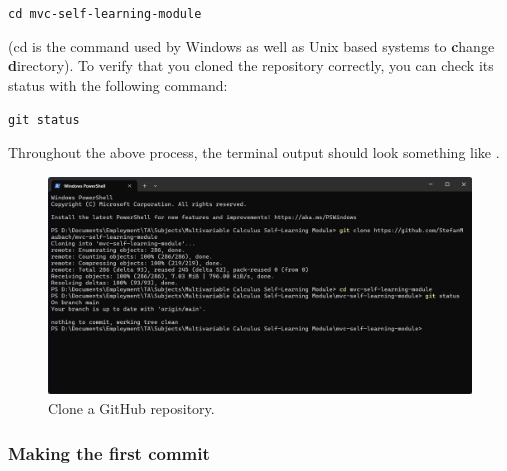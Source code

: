 \documentclass[a4paper,10pt]{article}
\begin{document}
\texttt{cd mvc-self-learning-module}

(cd is the command used by Windows as well as Unix based systems to \textbf{c}hange \textbf{d}irectory). To verify that you cloned the repository correctly, you can check its status with the following command:

\texttt{git status}

Throughout the above process, the terminal output should look something like .

\begin{figure}[htbp]
    \centering
    \includegraphics[width=\textwidth]{git_clone.png}
    \caption{Clone a GitHub repository.}
    \label{fig:git_clone}   
\end{figure}


\subsubsection{Making the first commit}
\label{sec:first_commit}
\end{document}
